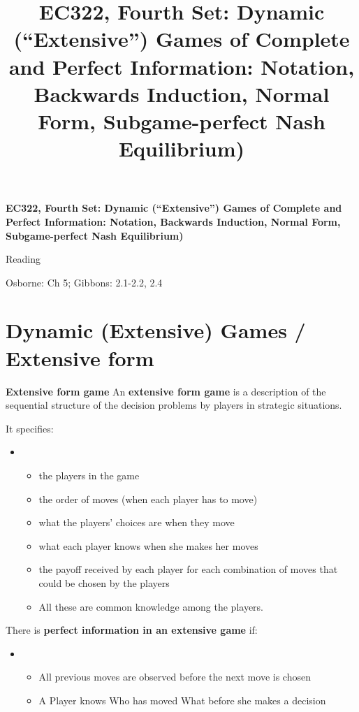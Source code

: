 

\title{EC322, Fourth Set: Dynamic (``Extensive'') Games of Complete and
Perfect Information: Notation, Backwards Induction, Normal Form,
Subgame-perfect Nash Equilibrium)}



    \textbf{EC322, Fourth Set: Dynamic (``Extensive'') Games of Complete and Perfect Information: Notation,
    Backwards Induction, Normal Form, Subgame-perfect Nash Equilibrium)}



Reading

    Osborne: Ch 5; Gibbons: 2.1-2.2, 2.4



\section{Dynamic (Extensive) Games / Extensive form}

\textbf{Extensive form game}
An \textbf{extensive form game }is a description of the sequential structure
of the decision problems by players in strategic situations.

It specifies:

\begin{itemize}
\item
\begin{itemize}
\item the players in the game

\item the order of moves (when each player has to move)

\item what the players' choices are when they move

\item what each player knows when she makes her moves

\item the payoff received by each player for each combination of moves that
could be chosen by the players

\item All these are common knowledge among the players.
\end{itemize}
\end{itemize}




There is \textbf{perfect information in an extensive game} if:

\begin{itemize}
\item
\begin{itemize}
\item All previous moves are observed before the next move is chosen

\item A Player knows Who has moved What before she makes a decision\bigskip
\end{itemize}
\end{itemize}




